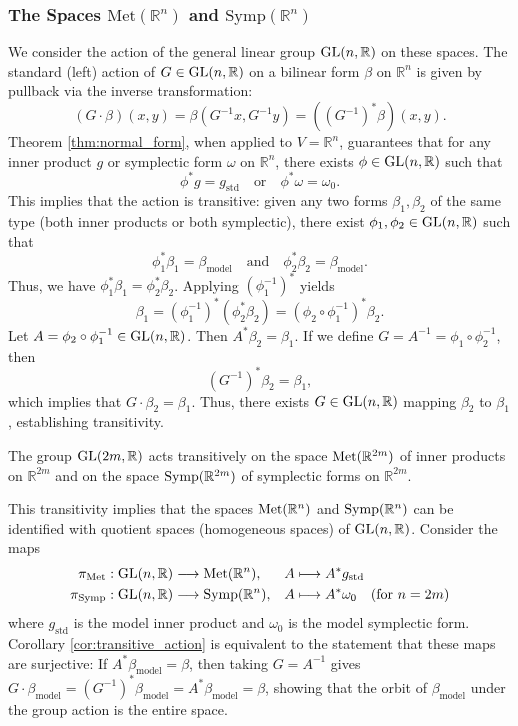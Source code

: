 \subsubsection{The Spaces $\text{Met}(\mathbb{R}^n)$ and $\text{Symp}(\mathbb{R}^n)$}

We consider the action of the general linear group $\mathrm{GL}(n, \mathbb{R})$ on these spaces. The standard (left) action of $G \in \mathrm{GL}(n, \mathbb{R})$ on a bilinear form $\beta$ on $\mathbb{R}^n$ is given by pullback via the inverse transformation:
\[
(G \cdot \beta)(x, y) = \beta(G^{-1}x, G^{-1}y) = ((G^{-1})^*\beta)(x, y).
\]
Theorem \ref{thm:normal_form}, when applied to $V = \mathbb{R}^n$, guarantees that for any inner product $g$ or symplectic form $\omega$ on $\mathbb{R}^n$, there exists $\phi \in \mathrm{GL}(n, \mathbb{R})$ such that
\[
\phi^* g = g_{\text{std}} \quad \text{or} \quad \phi^* \omega = \omega_0.
\]
This implies that the action is transitive: given any two forms $\beta_1, \beta_2$ of the same type (both inner products or both symplectic), there exist $\phi_1, \phi_2 \in \mathrm{GL}(n, \mathbb{R})$ such that
\[
\phi_1^* \beta_1 = \beta_{\text{model}} \quad \text{and} \quad \phi_2^* \beta_2 = \beta_{\text{model}}.
\]
Thus, we have $\phi_1^* \beta_1 = \phi_2^* \beta_2$. Applying $(\phi_1^{-1})^*$ yields
\[
\beta_1 = (\phi_1^{-1})^*(\phi_2^* \beta_2) = (\phi_2 \circ \phi_1^{-1})^* \beta_2.
\]
Let $A = \phi_2 \circ \phi_1^{-1} \in \mathrm{GL}(n, \mathbb{R})$. Then $A^* \beta_2 = \beta_1$. If we define $G = A^{-1} = \phi_1 \circ \phi_2^{-1}$, then
\[
(G^{-1})^* \beta_2 = \beta_1,
\]
which implies that $G \cdot \beta_2 = \beta_1$. Thus, there exists $G \in \mathrm{GL}(n, \mathbb{R})$ mapping $\beta_2$ to $\beta_1$, establishing transitivity.


\begin{corollary} \label{cor:transitive_action}
The group $\mathrm{GL}(2m, \mathbb{R})$ acts transitively on the space $\operatorname{Met}(\mathbb{R}^{2m})$ of inner products on $\mathbb{R}^{2m}$ and on the space $\operatorname{Symp}(\mathbb{R}^{2m})$ of symplectic forms on $\mathbb{R}^{2m}$.
\end{corollary}

This transitivity implies that the spaces $\operatorname{Met}(\mathbb{R}^n)$ and $\operatorname{Symp}(\mathbb{R}^n)$ can be identified with quotient spaces (homogeneous spaces) of $\mathrm{GL}(n, \mathbb{R})$. Consider the maps
\begin{align}
    \pi_{\operatorname{Met}}: \mathrm{GL}(n, \mathbb{R}) &\longrightarrow \operatorname{Met}(\mathbb{R}^n), & A &\longmapsto A^* g_{\text{std}} \label{eq:map_met}\\
    \pi_{\operatorname{Symp}}: \mathrm{GL}(n, \mathbb{R}) &\longrightarrow \operatorname{Symp}(\mathbb{R}^n), & A &\longmapsto A^* \omega_{0} \label{eq:map_symp} \quad (\text{for } n=2m)
\end{align}
where $g_{\text{std}}$ is the model inner product and $\omega_0$ is the model symplectic form. Corollary \ref{cor:transitive_action} is equivalent to the statement that these maps are surjective: If $A^* \beta_{\text{model}} = \beta$, then taking $G = A^{-1}$ gives $G \cdot \beta_{\text{model}} = (G^{-1})^* \beta_{\text{model}} = A^* \beta_{\text{model}} = \beta$, showing that the orbit of $\beta_{\text{model}}$ under the group action is the entire space.

